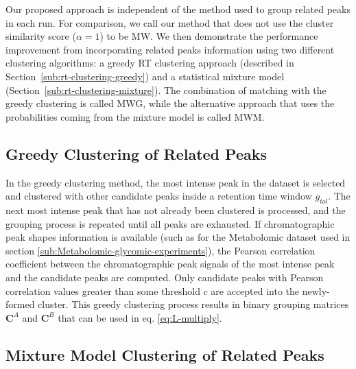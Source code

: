 Our proposed approach is independent of the method used to group related peaks in each run. For comparison, we call our method that does not use the cluster similarity score ($\alpha=1$) to be \ac{MW}. We then demonstrate the performance improvement from incorporating related peaks information using two different clustering algorithms: a greedy RT clustering approach (described in Section~\ref{sub:rt-clustering-greedy}) and a statistical mixture model (Section~\ref{sub:rt-clustering-mixture}). The combination of matching with the greedy clustering is called MWG, while the alternative approach that uses the probabilities coming from the mixture model is called MWM.

\subsection{Greedy Clustering of Related Peaks\label{sub:rt-clustering-greedy}}

In the greedy clustering method, the most intense peak in the dataset is selected and clustered with other candidate peaks inside a retention time window $g_{tol}$. The next most intense peak that has not already been clustered is processed, and the grouping process is repeated until all peaks are exhausted. If chromatographic peak shapes information is available (such as for the Metabolomic dataset used in section \ref{sub:Metabolomic-glycomic-experiments}), the Pearson correlation coefficient between the chromatographic peak signals of the most intense peak and the candidate peaks are computed. Only candidate peaks with Pearson correlation values greater than some threshold $c$ are accepted into the newly-formed cluster. This greedy clustering process results in binary grouping matrices $\mathbf{C}^A$ and $\mathbf{C}^B$ that can be used in eq. \ref{eq:L-multiply}.

\subsection{Mixture Model Clustering of Related Peaks\label{sub:rt-clustering-mixture}}


